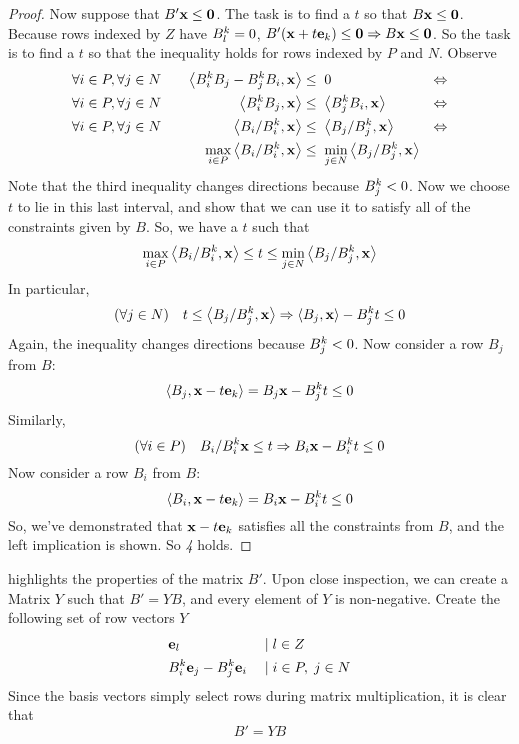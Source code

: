 \begin{proof}
	Now suppose that $B'\mathbf{x} \leq \mathbf{0}$.  The task is to find a $t$ so that $B\mathbf{x} \leq \mathbf{0}$.  Because rows indexed by $Z$ have $B^k_l = 0$, $B'(\mathbf{x}+t\mathbf{e}_k) \leq \mathbf{0} \Rightarrow B\mathbf{x} \leq \mathbf{0}$.  So the task is to find a $t$ so that the inequality holds for rows indexed by $P$ and $N$.  Observe
	\begin{alignat*}{3}
		\forall i\in P,\forall j \in N & \quad & \left\langle B^k_i B_j - B^k_j B_i, \mathbf{x} \right\rangle    & \leq  \; 0                                & \Leftrightarrow \\
		\forall i\in P,\forall j \in N & \quad & \left\langle B^k_i B_j, \mathbf{x} \right\rangle               & \leq  \; \left\langle B^k_j B_i, \mathbf{x} \right\rangle                & \Leftrightarrow \\
		\forall i\in P,\forall j \in N & \quad & \left\langle B_i/B^k_i, \mathbf{x} \right\rangle               & \leq  \; \left\langle B_j/B^k_j, \mathbf{x} \right\rangle                & \Leftrightarrow \\
		      & \quad & \max_{i\in P} \left\langle B_i/B^k_i, \mathbf{x} \right\rangle & \leq  \; \min_{j\in N}  \left\langle B_j/B^k_j, \mathbf{x} \right\rangle &
	\end{alignat*}
	Note that the third inequality changes directions because $B^k_j < 0$.  Now we choose $t$ to lie in this last interval, and show that we can use it to satisfy all of the constraints given by $ B$.  So, we have a $t$ such that
	\[ \max_{i\in P} \left\langle B_i/B^k_i, \mathbf{x} \right\rangle \leq t \leq \min_{j\in N} \left\langle B_j/B^k_j, \mathbf{x} \right\rangle \]
	In particular,
  \[(\forall j\in N)\quad t \leq \left\langle B_j/B^k_j, \mathbf{x} \right\rangle \Rightarrow \left\langle B_j, \mathbf{x} \right\rangle - B^k_j t \leq 0\]
	Again, the inequality changes directions because $B^k_j < 0$.  Now consider a row $ B_j$ from $ B$:
	\[ \left\langle B_j, \mathbf{x}-t\mathbf{e}_k \right\rangle =  B_j {\mathbf{x}} - B^k_j t \leq 0 \]
	Similarly,
  \[(\forall i\in P)\quad B_i/B^k_i {\mathbf{x}} \leq t \Rightarrow B_i {\mathbf{x}} - B^k_i t \leq 0 \]
	Now consider a row $ B_i$ from $ B$:
	\[ \left\langle B_i, \mathbf{x}-t\mathbf{e}_k \right\rangle =  B_i {\mathbf{x}} - B^k_i t \leq 0 \]
	So, we've demonstrated that $\mathbf{x}-t\mathbf{e}_k$ satisfies all the constraints from $B$, and the left implication is shown.  So \textit{4} holds.
\end{proof}

\begin{Remark}\label{fm_matrix}
	  highlights the properties of the matrix $B'$.  Upon close inspection, we can create a Matrix $Y$ such that $B' = YB$, and every element of $Y$ is non-negative.  Create the following set of row vectors $Y$
	\begin{alignat*}{2}
		 & \mathbf{e}_l                  & \;|\; & l \in Z          \\
		 & B^k_i \mathbf{e}_j - B^k_j \mathbf{e}_i & \;|\; & i\in P,\; j\in N
	\end{alignat*}
	Since the basis vectors simply select rows during matrix multiplication, it is clear that
	\[ B' = YB \]
\end{Remark}

